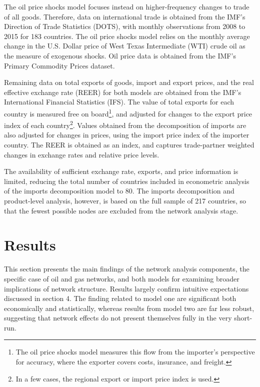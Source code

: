 \documentclass[10pt,letterpaper,pdftex]{article}
\begin{document}
The oil price shocks model focuses instead on higher-frequency changes to trade of all goods. Therefore, data on international trade is obtained from the IMF's Direction of Trade Statistics (DOTS), with monthly observations from 2008 to 2015 for 183 countries. The oil price shocks model relies on the monthly average change in the U.S. Dollar price of West Texas Intermediate (WTI) crude oil as the measure of exogenous shocks. Oil price data is obtained from the IMF's Primary Commodity Prices dataset. 

Remaining data on total exports of goods, import and export prices, and the real effective exchange rate (REER) for both models are obtained from the IMF's International Financial Statistics (IFS). The value of total exports for each country is measured free on board\footnote{The oil price shocks model measures this flow from the importer's perspective for accuracy, where the exporter covers costs, insurance, and freight.}, and adjusted for changes to the export price index of each country\footnote{In a few cases, the regional export or import price index is used.}. Values obtained from the decomposition of imports are also adjusted for changes in prices, using the import price index of the importer country. The REER is obtained as an index, and captures trade-partner weighted changes in exchange rates and relative price levels. 

The availability of sufficient exchange rate, exports, and price information is limited, reducing the total number of countries included in econometric analysis of the imports decomposition model to 80. The imports decomposition and product-level analysis, however, is based on the full sample of 217 countries, so that the fewest possible nodes are excluded from the network analysis stage.

\section{Results} \thispagestyle{emptyheader}\label{results}
This section presents the main findings of the network analysis components, the specific case of oil and gas networks, and both models for examining broader implications of network structure. Results largely confirm intuitive expectations discussed in section 4. The finding related to model one are significant both economically and statistically, whereas results from model two are far less robust, suggesting that network effects do not present themselves fully in the very short-run.
\end{document}
